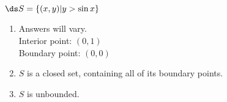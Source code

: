 {$\ds S=\{ (x,y) | y>\sin x\}$}
{\begin{enumerate}
\item Answers will vary.\\
Interior point: $(0,1)$\\
Boundary point: $(0,0)$\\
\item $S$ is a closed set, containing all of its boundary points.\\
\item $S$ is unbounded.
\end{enumerate}
}